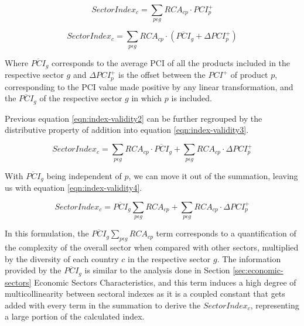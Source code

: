 \begin{appendices}
\begin{equation}\label{eqn:index-validity1}
    SectorIndex_{c} = \sum_{p\epsilon g}RCA_{cp} \cdot PCI_{p}^{+}
\end{equation}

\begin{equation}\label{eqn:index-validity2}
    SectorIndex_{c} = \sum_{p\epsilon g}RCA_{cp} \cdot \left(\overline{PCI}_{g} + \Delta PCI_{p}^{+} \right)
\end{equation}

Where $\overline{PCI}_{g}$ corresponds to the average PCI of all the products included in the respective sector $g$ and $\Delta PCI_{p}^{+}$ is the offset between the $PCI^{+}$ of product $p$, corresponding to the PCI value made positive by any linear transformation, and the $\overline{PCI}_{g}$ of the respective sector $g$ in which $p$ is included.

Previous equation \eqref{eqn:index-validity2} can be further regrouped by the distributive property of addition into equation \eqref{eqn:index-validity3}.

\begin{equation}\label{eqn:index-validity3}
    SectorIndex_{c} = \sum_{p\epsilon g}RCA_{cp} \cdot \overline{PCI}_{g} +  \sum_{p\epsilon g}RCA_{cp} \cdot \Delta PCI_{p}^{+}
\end{equation}

With $\overline{PCI}_{g}$ being independent of $p$, we can move it out of the summation, leaving us with equation \eqref{eqn:index-validity4}.

\begin{equation}\label{eqn:index-validity4}
    SectorIndex_{c} = \overline{PCI}_{g}\sum_{p\epsilon g}RCA_{cp} +  \sum_{p\epsilon g}RCA_{cp} \cdot \Delta PCI_{p}^{+}
\end{equation}

In this formulation, the $\overline{PCI}_{g}\sum_{p\epsilon g}RCA_{cp}$ term corresponds to a quantification of the complexity of the overall sector when compared with other sectors, multiplied by the diversity of each country $c$ in the respective sector $g$. The information provided by the $\overline{PCI}_{g}$ is similar to the analysis done in Section \ref{sec:economic-sectors} Economic Sectors Characteristics, and this term induces a high degree of multicollinearity between sectoral indexes as it is a coupled constant that gets added with every term in the summation to derive the $SectorIndex_{c}$, representing a large portion of the calculated index.


\end{appendices}

